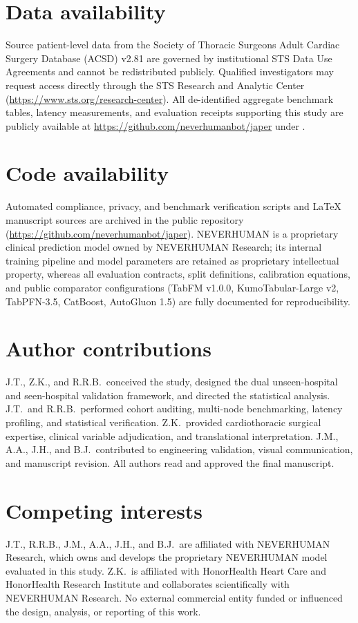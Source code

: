 \section*{Data availability}
Source patient-level data from the Society of Thoracic Surgeons Adult Cardiac Surgery Database (ACSD) v2.81 are governed by institutional STS Data Use Agreements and cannot be redistributed publicly. Qualified investigators may request access directly through the STS Research and Analytic Center (\url{https://www.sts.org/research-center}). All de-identified aggregate benchmark tables, latency measurements, and evaluation receipts supporting this study are publicly available at \url{https://github.com/neverhumanbot/japer} under .

\section*{Code availability}
Automated compliance, privacy, and benchmark verification scripts and LaTeX manuscript sources are archived in the public repository (\url{https://github.com/neverhumanbot/japer}). NEVERHUMAN is a proprietary clinical prediction model owned by NEVERHUMAN Research; its internal training pipeline and model parameters are retained as proprietary intellectual property, whereas all evaluation contracts, split definitions, calibration equations, and public comparator configurations (TabFM v1.0.0, KumoTabular-Large v2, TabPFN-3.5, CatBoost, AutoGluon 1.5) are fully documented for reproducibility.

\section*{Author contributions}
J.T., Z.K., and R.R.B.\ conceived the study, designed the dual unseen-hospital and seen-hospital validation framework, and directed the statistical analysis. J.T.\ and R.R.B.\ performed cohort auditing, multi-node benchmarking, latency profiling, and statistical verification. Z.K.\ provided cardiothoracic surgical expertise, clinical variable adjudication, and translational interpretation. J.M., A.A., J.H., and B.J.\ contributed to engineering validation, visual communication, and manuscript revision. All authors read and approved the final manuscript.

\section*{Competing interests}
J.T., R.R.B., J.M., A.A., J.H., and B.J.\ are affiliated with NEVERHUMAN Research, which owns and develops the proprietary NEVERHUMAN model evaluated in this study. Z.K.\ is affiliated with HonorHealth Heart Care and HonorHealth Research Institute and collaborates scientifically with NEVERHUMAN Research. No external commercial entity funded or influenced the design, analysis, or reporting of this work.
